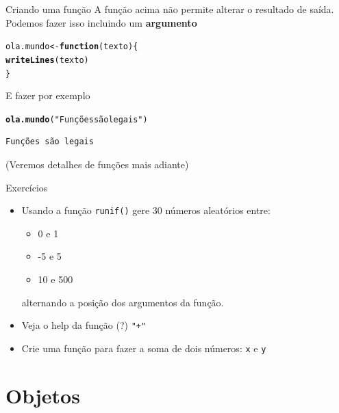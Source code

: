 \documentclass[10pt,handout]{beamer}\usepackage[]{graphicx}\usepackage[]{color}
\makeatletter
\newcommand{\hlstr}[1]{\textcolor[rgb]{0.192,0.494,0.8}{#1}}%
\newcommand{\hlstd}[1]{\textcolor[rgb]{0.345,0.345,0.345}{#1}}%
\newcommand{\hlkwa}[1]{\textcolor[rgb]{0.161,0.373,0.58}{\textbf{#1}}}%
\newcommand{\hlkwb}[1]{\textcolor[rgb]{0.69,0.353,0.396}{#1}}%
\newcommand{\hlkwc}[1]{\textcolor[rgb]{0.333,0.667,0.333}{#1}}%
\newcommand{\hlkwd}[1]{\textcolor[rgb]{0.737,0.353,0.396}{\textbf{#1}}}%
\newenvironment{kframe}{%
 \def\at@end@of@kframe{}%
 \ifinner\ifhmode%
  \def\at@end@of@kframe{\end{minipage}}%
  \begin{minipage}{\columnwidth}%
 \fi\fi%
 \def\FrameCommand##1{\hskip\@totalleftmargin \hskip-\fboxsep
 \colorbox{shadecolor}{##1}\hskip-\fboxsep
     \hskip-\linewidth \hskip-\@totalleftmargin \hskip\columnwidth}%
 \MakeFramed {\advance\hsize-\width
   \@totalleftmargin\z@ \linewidth\hsize
   \@setminipage}}%
 {\par\unskip\endMakeFramed%
 \at@end@of@kframe}
\newenvironment{knitrout}{}{} %
\makeatother
\begin{document}
\begin{frame}[fragile]{Criando uma função}
A função acima não permite alterar o resultado de saída. Podemos fazer
isso incluindo um \textbf{argumento}
\begin{knitrout}\small
{}\color{fgcolor}\begin{kframe}
\begin{alltt}
\hlstd{ola.mundo} \hlkwb{<-} \hlkwa{function}\hlstd{(}\hlkwc{texto}\hlstd{)\{}
    \hlkwd{writeLines}\hlstd{(texto)}
\hlstd{\}}
\end{alltt}
\end{kframe}
\end{knitrout}
E fazer por exemplo
\begin{knitrout}\small
{}\color{fgcolor}\begin{kframe}
\begin{alltt}
\hlkwd{ola.mundo}\hlstd{(}\hlstr{"Funções são legais"}\hlstd{)}
\end{alltt}
\begin{verbatim}
Funções são legais
\end{verbatim}
\end{kframe}
\end{knitrout}
(Veremos detalhes de funções mais adiante)
\end{frame}

\begin{frame}[fragile]{Exercícios}
  \begin{itemize}
  \item Usando a função \verb|runif()| gere $30$ números
    aleatórios entre:
    \begin{itemize}
    \item 0 e 1
    \item -5 e 5
    \item 10 e 500
    \end{itemize}
    alternando a posição dos argumentos da função.
  \item Veja o help da função (?) \verb|"+"|
  \item Crie uma função para fazer a soma de dois números: \texttt{x} e
    \texttt{y}
  \end{itemize}

\end{frame}

\section{Objetos}
\end{document}
